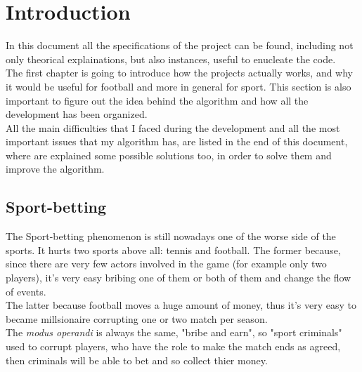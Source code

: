 \documentclass[a4paper,titlepage,11pt]{report}
\begin{document}
{\selectfont
\begin{frontespizio}
\Titolo{\textcolor{black}{Football-betting Detection System}}
\Rientro{2.5cm}
\end{frontespizio}



\pagebreak



\tableofcontents



\chapter{
Introduction}
In this document all the specifications of the project can be found, including not only theorical explainations, but also instances, useful to enucleate the code.\\
The first chapter is going to introduce how the projects actually works, and why it would be useful for football and more in general for sport. This section is also important to figure out the idea behind the algorithm and how all the development has been organized.\\
All the main difficulties that I faced during the development and all the most important issues that my algorithm has, are listed in the end of this document, where are explained some possible solutions too, in order to solve them and improve the algorithm.

\section{
Sport-betting}
The Sport-betting phenomenon is still nowadays one of the worse side of the sports. It hurts two sports above all: tennis and football. The former because, since there are very few actors involved in the game (for example only two players), it's very easy bribing one of them or both of them and change the flow of events.\\
The latter because football moves a huge amount of money, thus it's very easy to became millsionaire corrupting one or two match per season.\\
The \textit{modus operandi} is always the same, "bribe and earn", so "sport criminals" used to corrupt players, who have the role to make the match ends as agreed, then criminals will be able to bet and so collect thier money.

}
\end{document}

